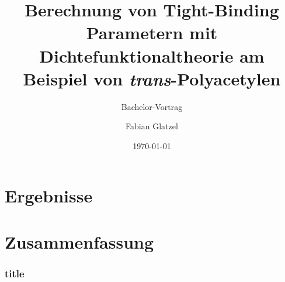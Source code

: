 \documentclass[11pt]{beamer}
\author{Fabian Glatzel}
\title[Bachelor Vortrag]{Berechnung von Tight-Binding Parametern mit Dichtefunktionaltheorie am Beispiel von \emph{trans}-Polyacetylen}
\subtitle{Bachelor-Vortrag}
\institute{Physikalisches Institut}
\date{\today}
\begin{document}
\begin{frame}[plain]
	\maketitle
\end{frame}

\begin{frame}
\tableofcontents
\end{frame}








\section{Ergebnisse}
\section{Zusammenfassung}
\begin{frame}
	\frametitle{title}
\end{frame}
\end{document}
